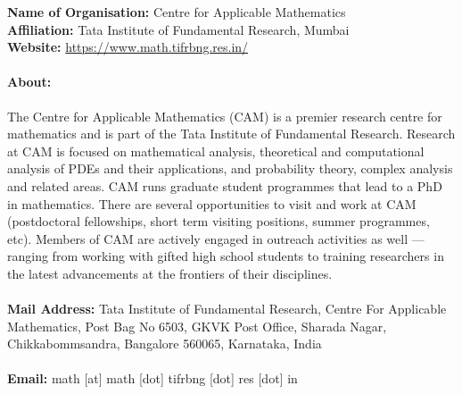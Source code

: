 \textbf{Name of Organisation:} Centre for Applicable Mathematics\\
\textbf{Affiliation:} Tata Institute of Fundamental Research, Mumbai\\
\textbf{Website:} \href{https://www.math.tifrbng.res.in/}{https://www.math.tifrbng.res.in/}
\paragraph{About:}The Centre for Applicable Mathematics (CAM) is a premier research centre for mathematics and is part of the Tata Institute of Fundamental Research. Research at CAM is focused on mathematical analysis, theoretical and computational analysis of PDEs and their applications, and probability theory, complex analysis and related areas. CAM runs graduate student programmes that lead to a PhD in mathematics. There are several opportunities to visit and work at CAM (postdoctoral fellowships, short term visiting positions, summer programmes, etc). Members of CAM are actively engaged in outreach activities as well — ranging from working with gifted high school students to training researchers in the latest advancements at the frontiers of their disciplines.\\ \\
\textbf{Mail Address:} Tata Institute of Fundamental Research, Centre For Applicable Mathematics, Post Bag No 6503, GKVK Post Office, Sharada Nagar, Chikkabommsandra, Bangalore 560065, Karnataka, India\\ \\
\textbf{Email:} math [at] math [dot] tifrbng [dot] res [dot] in